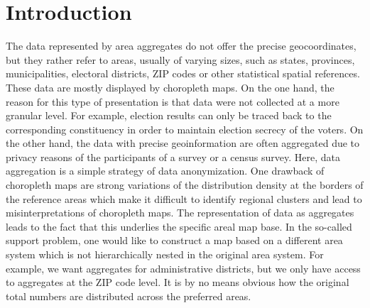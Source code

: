 \section{Introduction}

The data represented by area aggregates do not offer the precise geocoordinates, but they rather refer to areas, usually of varying sizes, such as states, provinces, municipalities, electoral districts, ZIP codes or other statistical spatial references.
These data are mostly displayed by  choropleth maps.
On the one hand, the reason for this type of presentation is that data were not collected at a more granular level. 
For example, election results can only be traced back to the corresponding constituency in order to maintain election secrecy of the voters.
On the other hand, the data with precise geoinformation are often aggregated due to privacy reasons of the participants of a survey or a census survey. Here, data aggregation is a simple strategy of data anonymization.
One drawback of choropleth maps are strong variations  of the distribution density at the borders of the reference areas which make it difficult to identify regional clusters and lead to   misinterpretations of choropleth maps. 
The representation of data as aggregates leads to the fact that this underlies the specific areal map base.
In the so-called support problem, one would like to construct a map based on a different area system which is not hierarchically nested in the original area system.
For example, we want aggregates for administrative districts, but we only have access to aggregates at the ZIP code level. It is by no means obvious how the original total numbers are distributed across the preferred areas.\\


